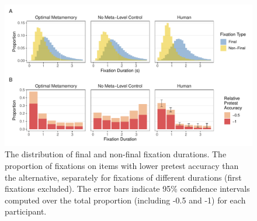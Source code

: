 \begin{figure}[t!]
  \includegraphics[scale=.65]{figs/memory/exp2/commitment.pdf}
  \caption{
     The distribution of final and non-final fixation durations.
     The proportion of fixations on items with lower pretest accuracy than the alternative, separately for fixations of different durations (first fixations excluded). The error bars indicate 95\% confidence intervals computed over the total proportion (including -0.5 and -1) for each participant.
  \label{fig:commitment}
}
\end{figure}

